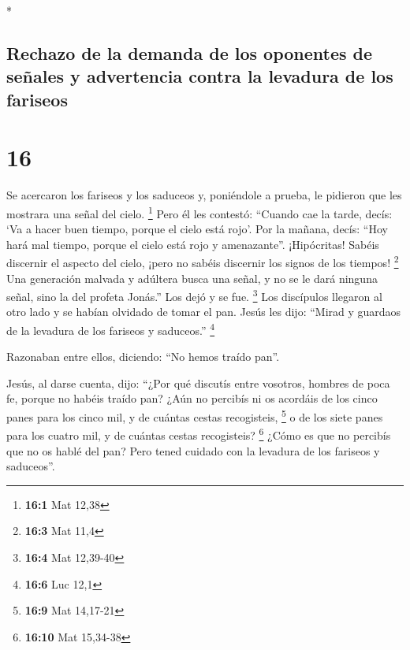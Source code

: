 \begin{paracol}{2}
\begin{otherlanguage}{english}
\end{otherlanguage}

\switchcolumn[0]*

\hypertarget{rechazo-de-la-demanda-de-los-oponentes-de-seuxf1ales-y-advertencia-contra-la-levadura-de-los-fariseos}{%
\subsection{Rechazo de la demanda de los oponentes de señales y
advertencia contra la levadura de los
fariseos}\label{rechazo-de-la-demanda-de-los-oponentes-de-seuxf1ales-y-advertencia-contra-la-levadura-de-los-fariseos}}

\hypertarget{section-30}{%
\section{16}\label{section-30}}

 Se acercaron los fariseos y los saduceos y, poniéndole a
prueba, le pidieron que les mostrara una señal del cielo. \footnote{\textbf{16:1}
  Mat 12,38}  Pero él les contestó: ``Cuando cae la tarde,
decís: `Va a hacer buen tiempo, porque el cielo está rojo'.
 Por la mañana, decís: ``Hoy hará mal tiempo, porque el
cielo está rojo y amenazante''. ¡Hipócritas! Sabéis discernir el aspecto
del cielo, ¡pero no sabéis discernir los signos de los tiempos!
\footnote{\textbf{16:3} Mat 11,4}  Una generación malvada
y adúltera busca una señal, y no se le dará ninguna señal, sino la del
profeta Jonás.'' Los dejó y se fue. \footnote{\textbf{16:4} Mat 12,39-40}
 Los discípulos llegaron al otro lado y se habían olvidado
de tomar el pan.  Jesús les dijo: ``Mirad y guardaos de la
levadura de los fariseos y saduceos.'' \footnote{\textbf{16:6} Luc 12,1}

 Razonaban entre ellos, diciendo: ``No hemos traído pan''.

 Jesús, al darse cuenta, dijo: ``¿Por qué discutís entre
vosotros, hombres de poca fe, porque no habéis traído pan?
 ¿Aún no percibís ni os acordáis de los cinco panes para
los cinco mil, y de cuántas cestas recogisteis, \footnote{\textbf{16:9}
  Mat 14,17-21}  o de los siete panes para los cuatro
mil, y de cuántas cestas recogisteis? \footnote{\textbf{16:10} Mat
  15,34-38}  ¿Cómo es que no percibís que no os hablé del
pan? Pero tened cuidado con la levadura de los fariseos y saduceos''.


\end{paracol}
